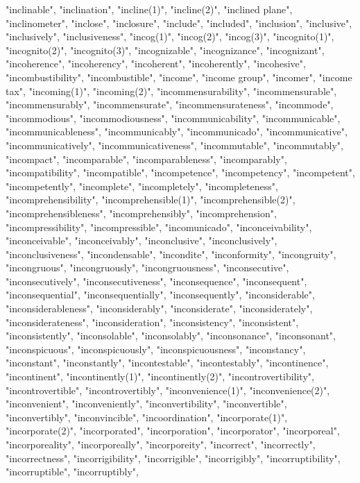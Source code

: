 "inclinable",
"inclination",
"incline(1)",
"incline(2)",
"inclined plane",
"inclinometer",
"inclose",
"inclosure",
"include",
"included",
"inclusion",
"inclusive",
"inclusively",
"inclusiveness",
"incog(1)",
"incog(2)",
"incog(3)",
"incognito(1)",
"incognito(2)",
"incognito(3)",
"incognizable",
"incognizance",
"incognizant",
"incoherence",
"incoherency",
"incoherent",
"incoherently",
"incohesive",
"incombustibility",
"incombustible",
"income",
"income group",
"incomer",
"income tax",
"incoming(1)",
"incoming(2)",
"incommensurability",
"incommensurable",
"incommensurably",
"incommensurate",
"incommensurateness",
"incommode",
"incommodious",
"incommodiousness",
"incommunicability",
"incommunicable",
"incommunicableness",
"incommunicably",
"incommunicado",
"incommunicative",
"incommunicatively",
"incommunicativeness",
"incommutable",
"incommutably",
"incompact",
"incomparable",
"incomparableness",
"incomparably",
"incompatibility",
"incompatible",
"incompetence",
"incompetency",
"incompetent",
"incompetently",
"incomplete",
"incompletely",
"incompleteness",
"incomprehensibility",
"incomprehensible(1)",
"incomprehensible(2)",
"incomprehensibleness",
"incomprehensibly",
"incomprehension",
"incompressibility",
"incompressible",
"incomunicado",
"inconceivability",
"inconceivable",
"inconceivably",
"inconclusive",
"inconclusively",
"inconclusiveness",
"incondensable",
"incondite",
"inconformity",
"incongruity",
"incongruous",
"incongruously",
"incongruousness",
"inconsecutive",
"inconsecutively",
"inconsecutiveness",
"inconsequence",
"inconsequent",
"inconsequential",
"inconsequentially",
"inconsequently",
"inconsiderable",
"inconsiderableness",
"inconsiderably",
"inconsiderate",
"inconsiderately",
"inconsiderateness",
"inconsideration",
"inconsistency",
"inconsistent",
"inconsistently",
"inconsolable",
"inconsolably",
"inconsonance",
"inconsonant",
"inconspicuous",
"inconspicuously",
"inconspicuousness",
"inconstancy",
"inconstant",
"inconstantly",
"incontestable",
"incontestably",
"incontinence",
"incontinent",
"incontinently(1)",
"incontinently(2)",
"incontrovertibility",
"incontrovertible",
"incontrovertibly",
"inconvenience(1)",
"inconvenience(2)",
"inconvenient",
"inconveniently",
"inconvertibility",
"inconvertible",
"inconvertibly",
"inconvincible",
"incoordination",
"incorporate(1)",
"incorporate(2)",
"incorporated",
"incorporation",
"incorporator",
"incorporeal",
"incorporeality",
"incorporeally",
"incorporeity",
"incorrect",
"incorrectly",
"incorrectness",
"incorrigibility",
"incorrigible",
"incorrigibly",
"incorruptibility",
"incorruptible",
"incorruptibly",
